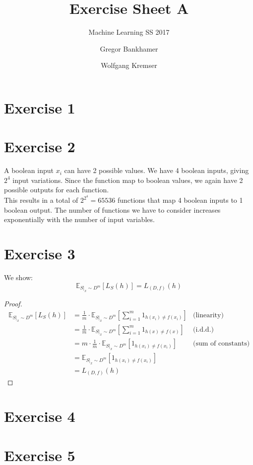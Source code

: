 \documentclass[12pt]{scrartcl}
\begin{document}
		
\title{Exercise Sheet A}
\subtitle{Machine Learning SS 2017}
\author{Gregor Bankhamer \and Wolfgang Kremser}
\date{}
\maketitle


\section*{Exercise 1}

\section*{Exercise 2}
A boolean input $x_i$ can have 2 possible values. We have 4 boolean inputs, giving $2^4$ input variations. Since the function map to boolean values, we again have 2 possible outputs for each function. \\
This results in a total of $2^{2^4} = 65536$ functions that map 4 boolean inputs to 1 boolean output. The number of functions we have to consider increases exponentially with the number of input variables.

\section*{Exercise 3}
We show: 
\begin{equation*}
\mathbb{E}_{S|_x \sim D^m}[L_S(h)]  = L_{(D,f)}(h)
\end{equation*}

\begin{proof}
	\begin{equation*}
		\begin{aligned}
			\mathbb{E}_{S|_x \sim D^m}[L_S(h)]  & = \frac{1}{m} \cdot \mathbb{E}_{S|_x \sim D^m}\left[\sum_{i=1}^{m} 1_{h(x_i)\neq f(x_i)}\right] & \text{(linearity)} \\
												& = \frac{1}{m} \cdot \mathbb{E}_{S|_x \sim D^m}\left[\sum_{i=1}^{m} 1_{h(x)\neq f(x)}\right] & \text{(i.d.d.)} \\
												& = m \cdot \frac{1}{m} \cdot \mathbb{E}_{S|_x \sim D^m}\left[1_{h(x_i)\neq f(x_i)}\right]  & \text{(sum of constants)} \\
												& = \mathbb{E}_{S|_x \sim D^m}\left[1_{h(x_i)\neq f(x_i)}\right] & \\
												& = L_{(D,f)}(h)
		\end{aligned}
	\end{equation*}
\end{proof}

\section*{Exercise 4}

\section*{Exercise 5}

	
\end{document}
